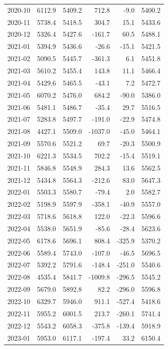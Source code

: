 \begin{longtable}{lrrrrr}
2020-10 & 6112.9 & 5409.2 & 712.8 & -9.0 & 5400.2 \\ 
2020-11 & 5738.4 & 5418.5 & 304.7 & 15.1 & 5433.6 \\ 
2020-12 & 5326.4 & 5427.6 & -161.7 & 60.5 & 5488.1 \\ 
2021-01 & 5394.9 & 5436.6 & -26.6 & -15.1 & 5421.5 \\ 
2021-02 & 5090.5 & 5445.7 & -361.3 & 6.1 & 5451.8 \\ 
2021-03 & 5610.2 & 5455.4 & 143.8 & 11.1 & 5466.4 \\ 
2021-04 & 5429.6 & 5465.5 & -43.1 & 7.2 & 5472.7 \\ 
2021-05 & 6070.2 & 5476.0 & 684.2 & -90.0 & 5386.0 \\ 
2021-06 & 5481.1 & 5486.7 & -35.4 & 29.7 & 5516.5 \\ 
2021-07 & 5283.8 & 5497.7 & -191.0 & -22.9 & 5474.8 \\ 
2021-08 & 4427.1 & 5509.0 & -1037.0 & -45.0 & 5464.1 \\ 
2021-09 & 5570.6 & 5521.2 & 69.7 & -20.3 & 5500.9 \\ 
2021-10 & 6221.3 & 5534.5 & 702.2 & -15.4 & 5519.1 \\ 
2021-11 & 5846.8 & 5548.9 & 284.3 & 13.6 & 5562.5 \\ 
2021-12 & 5434.8 & 5564.3 & -212.6 & 83.0 & 5647.3 \\ 
2022-01 & 5503.3 & 5580.7 & -79.4 & 2.0 & 5582.7 \\ 
2022-02 & 5198.9 & 5597.9 & -358.1 & -40.9 & 5557.0 \\ 
2022-03 & 5718.6 & 5618.8 & 122.0 & -22.3 & 5596.6 \\ 
2022-04 & 5538.0 & 5651.9 & -85.6 & -28.4 & 5623.6 \\ 
2022-05 & 6178.6 & 5696.1 & 808.4 & -325.9 & 5370.2 \\ 
2022-06 & 5589.4 & 5743.0 & -107.0 & -46.5 & 5696.5 \\ 
2022-07 & 5392.2 & 5791.6 & -148.4 & -251.0 & 5540.6 \\ 
2022-08 & 4535.4 & 5841.7 & -1009.8 & -296.5 & 5545.2 \\ 
2022-09 & 5679.0 & 5892.8 & 82.2 & -296.0 & 5596.8 \\ 
2022-10 & 6329.7 & 5946.0 & 911.1 & -527.4 & 5418.6 \\ 
2022-11 & 5955.2 & 6001.5 & 213.7 & -260.1 & 5741.4 \\ 
2022-12 & 5543.2 & 6058.3 & -375.8 & -139.4 & 5918.9 \\ 
2023-01 & 5953.0 & 6117.1 & -197.4 & 33.2 & 6150.4 \\ 

\end{longtable}
